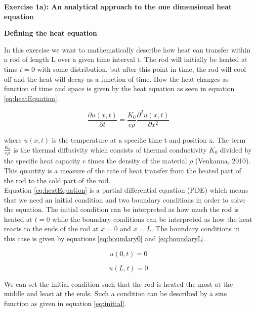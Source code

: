 \documentclass[12pt,a4paper]{article}
\begin{document}
\newpage

\begin{center}
\Large{\textbf{Exercise 1a): An analytical approach to the one dimensional heat equation}}
\end{center}

\begin{center}
\large{\textbf{Defining the heat equation}}
\end{center}

\noindent In this exercise we want to mathematically describe how heat can transfer within a rod of length L over a given time interval t. The rod will initially be heated at time $t = 0$ with some distribution, but after this point in time, the rod will cool off and the heat will decay as a function of time. How the heat changes as function of time and space is given by the heat equation as seen in equation \ref{eq:heatEquation}.

\begin{equation}\label{eq:heatEquation}
\frac{\partial u(x,t)}{\partial t} = \frac{K_0}{c\rho} \frac{\partial^2 u(x,t)}{\partial x^2} 
\end{equation}

\noindent where $u(x,t)$ is the temperature at a specific time t and position x. The term $\frac{K_0}{c\rho}$ is the thermal diffusivity which consists of thermal conductivity $K_0$ divided by the specific heat capacity c times the density of the material $\rho$ (Venkanna, 2010). This quantity is a measure of the rate of heat transfer from the heated part of the rod to the cold part of the rod. 
\\
Equation \ref{eq:heatEquation} is a partial differential equation (PDE) which means that we need an initial condition and two boundary conditions in order to solve the equation. The initial condition can be interpreted as how much the rod is heated at $t = 0$ while the boundary conditions can be interpreted as how the heat reacts to the ends of the rod at $x = 0$ and $x = L$. The boundary conditions in this case is given by equations \ref{eq:boundary0} and \ref{eq:boundaryL}.

\begin{equation}\label{eq:boundary0}
u(0,t) = 0
\end{equation}

\begin{equation}\label{eq:boundaryL}
u(L,t) = 0
\end{equation}

\noindent We can set the initial condition such that the rod is heated the most at the middle and least at the ends. Such a condition can be described by a sine function as given in equation \ref{eq:initial}.
\end{document}

